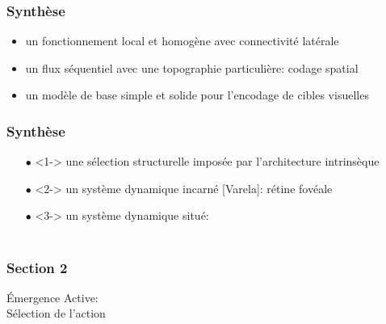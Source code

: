 \documentclass[10pt]{beamer}
\begin{document}
\begin{frame}
  \frametitle{Synth\`ese}
\begin{itemize}
\item<1-> un fonctionnement local et homog\`ene avec connectivit\'e lat\'erale
\item<2-> un flux s\'equentiel avec une topographie particuli\`ere: codage spatial
\item<3-> un mod\`ele de base simple et solide pour l'encodage de cibles visuelles\\
\end{itemize}
\end{frame}
\begin{frame}
  \frametitle{Synth\`ese}
\begin{itemize} %
\item[$\bullet$]<1-> une {\color{blue}s\'election structurelle} impos\'ee par l'architecture intrins\`eque 
\item[$\bullet$]<2-> un syst\`eme dynamique {\color{blue}incarn\'e} [Varela]: r\'etine fov\'eale
\item[$\bullet$]<3-> un syst\`eme dynamique {\color{blue}situ\'e}: \\
\vspace{0.2cm}\\
\hspace{2cm}
\end{itemize}
\end{frame}
\begin{frame}
  \frametitle{Section 2}
\begin{center}
{{\color{blue}\'Emergence Active:}\\
S\'election de l'action}
\end{center}
\end{frame}
\end{document}
